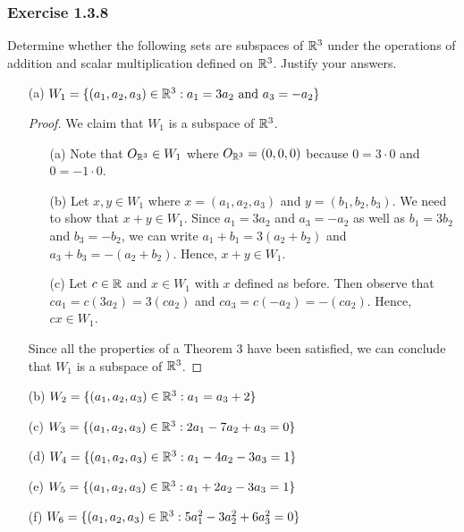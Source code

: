 \subsubsection{Exercise 1.3.8} Determine whether the following sets are subspaces of \( \mathbb{R}^{3}  \) under the operations of addition and scalar multiplication defined on \( \mathbb{R}^{3}  \). Justify your answers. 
\begin{enumerate}
    \item[(a)] \( W_{1} = \{ (a_{1}, a_{2}, a_{3}) \in \mathbb{R}^{3} : a_{1} = 3a_{2} \ \text{and} \ a_{3} =  -a_{2} \}  \)
        \begin{proof}
        We claim that \( W_{1}  \) is a subspace of \( \mathbb{R}^{3} \). 
        \begin{enumerate}
            \item[(a)] Note that \( O_{\mathbb{R}^{3}} \in W_{1}  \) where \( O_{\mathbb{R}^{3} } = (0,0,0) \) because \( 0 = 3 \cdot 0  \) and \( 0 = -1 \cdot 0  \).
            \item[(b)] Let \( x, y \in W_{1}  \) where \( x = (a_{1}, a_{2}, a_{3}) \) and \( y = (b_{1}, b_{2}, b_{3}) \). We need to show that \( x + y \in W_{1} \).  Since \( a_{1} = 3 a_{2}  \) and \( a_{3} = - a_{2} \) as well as \( b_{1} = 3 b_{2}  \) and \( b_{3} = - b_{2} \), we can write \( a_{1} + b_{1} = 3 (a_{2} + b_{2} )  \) and \( a_{3} + b_{3} = - (a_{2} + b_{2}) \). Hence, \( x + y \in W_{1} \).
            \item[(c)] Let \( c \in \mathbb{R}  \) and \( x \in W_{1}  \) with \( x  \) defined as before. Then observe that \( ca_{1} = c (3 a_{2}) = 3 (ca_{2}) \) and \( ca_{3} = c (-a_{2} ) = -(ca_{2}) \). Hence, \( cx \in W_{1} \).
        \end{enumerate}
        Since all the properties of a Theorem 3 have been satisfied, we can conclude that 
        \( W_{1} \) is a subspace of \( \mathbb{R}^{3} \).
         \end{proof}
    \item[(b)] \( W_{2} = \{ (a_{1}, a_{2}, a_{3}) \in \mathbb{R}^{3} : a_{1} = a_{3} + 2  \}  \)
    \item[(c)] \( W_{3} = \{ (a_{1}, a_{2}, a_{3}) \in \mathbb{R}^{3} : 2a_{1} - 7a_{2} + a_{3} = 0  \}  \)
    \item[(d)] \( W_{4} = \{ (a_{1}, a_{2}, a_{3}) \in \mathbb{R}^{3} : a_{1} - 4a_{2} - 3a_{3} = 1  \}  \)
    \item[(e)] \( W_{5} = \{ (a_{1}, a_{2} ,a_{3}) \in \mathbb{R}^{3} : a_{1} + 2a_{2} -  3a_{3} = 1   \}  \)
    \item[(f)] \( W_{6} = \{ (a_{1} , a_{2} ,a_{3}) \in \mathbb{R}^{3} : 5a_{1}^{2} - 3a_{2}^{2} + 6a_{3}^{2} = 0  \}  \)
\end{enumerate}


